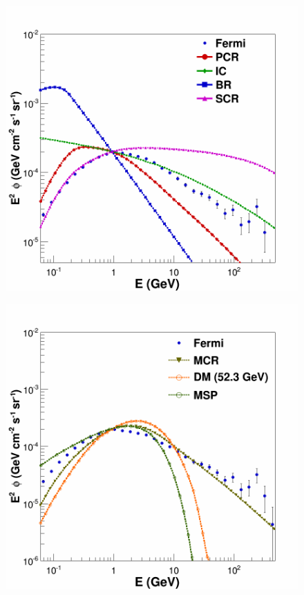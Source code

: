 \begin{figure}[h]
  \centering
  \begin{minipage}[h]{0.45\textwidth}
  	\centering
	\includegraphics[width=1\linewidth]{pic/method/norm_bkg_comp.png}
  	\subcaption{}
 	\label{fig:norm_bkg_component}
  \end{minipage}
  \hfill
  \begin{minipage}[h]{0.45\textwidth}
	  \centering
	  \includegraphics[width=1\linewidth]{pic/method/norm_excess_comp.png}

\end{minipage}
\end{figure}
